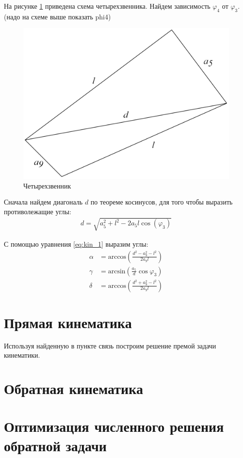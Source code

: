 На рисунке \ref{fig:scheme_four} приведена схема четырехзвенника. Найдем зависимость $ \varphi_4 $ от $ \varphi_3 $. \fixme (надо на схеме выше показать phi4)
\begin{figure}[h]
    \centering
    \includegraphics[scale=1]{chapter_kinematics/figure4.png}
    \caption{Четырехзвенник}
    \label{fig:scheme_four}
\end{figure}

Сначала найдем диагональ $d$ по теореме косинусов, для того чтобы выразить противолежащие углы:
\begin{align}
    d = \sqrt{a_5^2 + l^2 - 2a_5 l \cos(\varphi_3)} \label{eq:kin_1}
\end{align}

С помощью уравнения \ref{eq:kin_1} выразим углы:
\begin{align}
    \alpha &= \text{arccos}\left(\frac{d^2-a_9^2-l^2}{2 a_9 l}\right) \\
    \gamma &= \text{arcsin}\left(\frac{a_5}{d}\cos \varphi_3\right) \\
    \delta &= \text{arccos}\left(\frac{d^2+a_9^2-l^2}{2 a_9 l}\right)
\end{align}



\section{Прямая кинематика}\label{sec:direct_kinematics}
Используя найденную в пункте \fixme связь построим решение премой задачи кинематики.

\section{Обратная кинематика}


\section{Оптимизация численного решения обратной задачи}